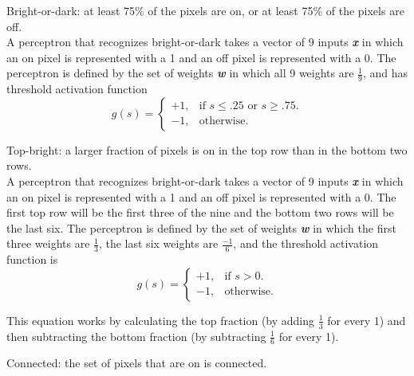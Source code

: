 \documentclass[solution, letterpaper]{cs121}
\begin{document}

\problem{} 

\subproblem Bright-or-dark: at least 75\% of the pixels are on, or at least 75\% of the pixels are off. \\

A perceptron that recognizes bright-or-dark takes a vector of 9 inputs {\textbf{\emph{x}}} in which an on pixel is represented with a 1 and an off pixel is represented with a 0. The perceptron is defined by the set of weights {\textbf{\emph{w}}} in which all 9 weights are $\frac{1}{9}$, and has threshold activation function
\begin{equation*}
  g(s)=\begin{cases}
    +1, & \text{if $s \leq .25$ or $s \geq .75$}.\\
    -1, & \text{otherwise}.
  \end{cases}
\end{equation*}

\subproblem Top-bright: a larger fraction of pixels is on in the top row than in the bottom two rows. \\

A perceptron that recognizes bright-or-dark takes a vector of 9 inputs {\textbf{\emph{x}}} in which an on pixel is represented with a 1 and an off pixel is represented with a 0. The first top row will be the first three of the nine and the bottom two rows will be the last six. The perceptron is defined by the set of weights {\textbf{\emph{w}}} in which the first three weights are  $\frac{1}{3}$, the last six weights are $\frac{-1}{6}$, and the threshold activation function is 
\begin{equation*}
  g(s)=\begin{cases}
    +1, & \text{if $s  >  0$}.\\
    -1, & \text{otherwise}.
  \end{cases}
\end{equation*}

This equation works by calculating the top fraction (by adding $\frac{1}{3}$ for every 1) and then subtracting the bottom fraction (by subtracting  $\frac{1}{6}$ for every 1). 

\subproblem Connected: the set of pixels that are on is connected. \\




\problem{}

\problem{}

\problem{}
\end{document}
